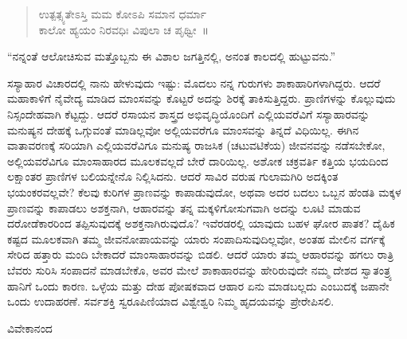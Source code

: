 \begin{verse}
 ಉತ್ಪತ್ಸ್ಯತೇಽಸ್ತಿ ಮಮ ಕೋಽಪಿ ಸಮಾನ ಧರ್ಮಾ\\
 ಕಾಲೋ ಹ್ಯಯಂ ನಿರವಧಿಃ ವಿಪುಲಾ ಚ ಪೃಥ್ವೀ~॥  
\end{verse}

“ನನ್ನಂತೆ ಆಲೋಚಿಸುವ ಮತ್ತೊಬ್ಬನು ಈ ವಿಶಾಲ ಜಗತ್ತಿನಲ್ಲಿ, ಅನಂತ ಕಾಲದಲ್ಲಿ ಹುಟ್ಟುವನು.”

ಸಸ್ಯಾಹಾರ ವಿಚಾರದಲ್ಲಿ ನಾನು ಹೇಳುವುದು ಇಷ್ಟು: ಮೊದಲು ನನ್ನ ಗುರುಗಳು ಶಾಕಾಹಾರಿಗಳಾಗಿದ್ದರು. ಆದರೆ ಮಹಾಕಾಳಿಗೆ ನೈವೇದ್ಯ ಮಾಡಿದ ಮಾಂಸವನ್ನು ಕೊಟ್ಟರೆ ಅದನ್ನು ಶಿರಕ್ಕೆ ತಾಕಿಸುತ್ತಿದ್ದರು. ಪ್ರಾಣಿಗಳನ್ನು ಕೊಲ್ಲುವುದು ನಿಸ್ಸಂದೇಹವಾಗಿ ಕೆಟ್ಟದ್ದು. ಆದರೆ ರಸಾಯನ ಶಾಸ್ತ್ರದ ಅಭಿವೃದ್ಧಿಯೊಂದಿಗೆ ಎಲ್ಲಿಯವರೆವಿಗೆ ಸಸ್ಯಾಹಾರವನ್ನು ಮನುಷ್ಯನ ದೇಹಕ್ಕೆ ಒಗ್ಗುವಂತೆ ಮಾಡಿಲ್ಲವೋ ಅಲ್ಲಿಯವರೆಗೂ ಮಾಂಸವನ್ನು ತಿನ್ನದೆ ವಿಧಿಯಿಲ್ಲ. ಈಗಿನ ವಾತಾವರಣಕ್ಕೆ ಸರಿಯಾಗಿ ಎಲ್ಲಿಯವರೆವಿಗೂ ಮನುಷ್ಯ ರಾಜಸಿಕ (ಚಟುವಟಿಕೆಯ) ಜೀವನವನ್ನು ನಡೆಸಬೇಕೋ, ಅಲ್ಲಿಯವರೆವಿಗೂ ಮಾಂಸಾಹಾರದ ಮೂಲಕವಲ್ಲದೆ ಬೇರೆ ದಾರಿಯಿಲ್ಲ. ಅಶೋಕ ಚಕ್ರವರ್ತಿ ಕತ್ತಿಯ ಭಯದಿಂದ ಲಕ್ಷಾಂತರ ಪ್ರಾಣಿಗಳ ಬಲಿಯನ್ನೇನೊ ನಿಲ್ಲಿಸಿದನು. ಆದರೆ ಸಾವಿರ ವರುಷ ಗುಲಾಮಗಿರಿ ಅದಕ್ಕಿಂತ ಭಯಂಕರವಲ್ಲವೇ? ಕೆಲವು ಕುರಿಗಳ ಪ್ರಾಣವನ್ನು ಕಾಪಾಡುವುದೋ, ಅಥವಾ ಅದರ ಬದಲು ಒಬ್ಬನ ಹೆಂಡತಿ ಮಕ್ಕಳ ಪ್ರಾಣವನ್ನು ಕಾಪಾಡಲು ಅಶಕ್ತನಾಗಿ, ಆಹಾರವನ್ನು ತನ್ನ ಮಕ್ಕಳಿಗೋಸುಗವಾಗಿ ಅದನ್ನು ಲೂಟಿ ಮಾಡುವ ದರೋಡೆಕಾರರಿಂದ ತಪ್ಪಿಸುವುದಕ್ಕೆ ಅಶಕ್ತನಾಗಿರುವುದೊ? ಇವೆರಡರಲ್ಲಿ ಯಾವುದು ಬಹಳ ಘೋರ ಪಾತಕ? ದೈಹಿಕ ಕಷ್ಟದ ಮೂಲಕವಾಗಿ ತಮ್ಮ ಜೀವನೋಪಾಯವನ್ನು ಯಾರು ಸಂಪಾದಿಸುವುದಿಲ್ಲವೋ, ಅಂತಹ ಮೇಲಿನ ವರ್ಗಕ್ಕೆ ಸೇರಿದ ಹತ್ತಾರು ಮಂದಿ ಬೇಕಾದರೆ ಮಾಂಸಾಹಾರವನ್ನು ಬಿಡಲಿ. ಆದರೆ ಯಾರು ತಮ್ಮ ಆಹಾರವನ್ನು ಹಗಲು ರಾತ್ರಿ ಬೆವರು ಸುರಿಸಿ ಸಂಪಾದನೆ ಮಾಡಬೇಕೊ, ಅವರ ಮೇಲೆ ಶಾಕಾಹಾರವನ್ನು ಹೇರಿರುವುದೇ ನಮ್ಮ ದೇಶದ ಸ್ವಾತಂತ್ರ್ಯ ಹಾನಿಗೆ ಒಂದು ಕಾರಣ. ಒಳ್ಳೆಯ ಮತ್ತು ದೇಹ ಪೋಷಕವಾದ ಆಹಾರ ಏನು ಮಾಡಬಲ್ಲದು ಎಂಬುದಕ್ಕೆ ಜಪಾನೇ ಒಂದು ಉದಾಹರಣೆ. ಸರ್ವಶಕ್ತಿ ಸ್ವರೂಪಿಣಿಯಾದ ವಿಶ್ವೇಶ್ವರಿ ನಿಮ್ಮ ಹೃದಯವನ್ನು ಪ್ರೇರೇಪಿಸಲಿ.

\begin{flushright}
ವಿವೇಕಾನಂದ
\end{flushright}

\relax
